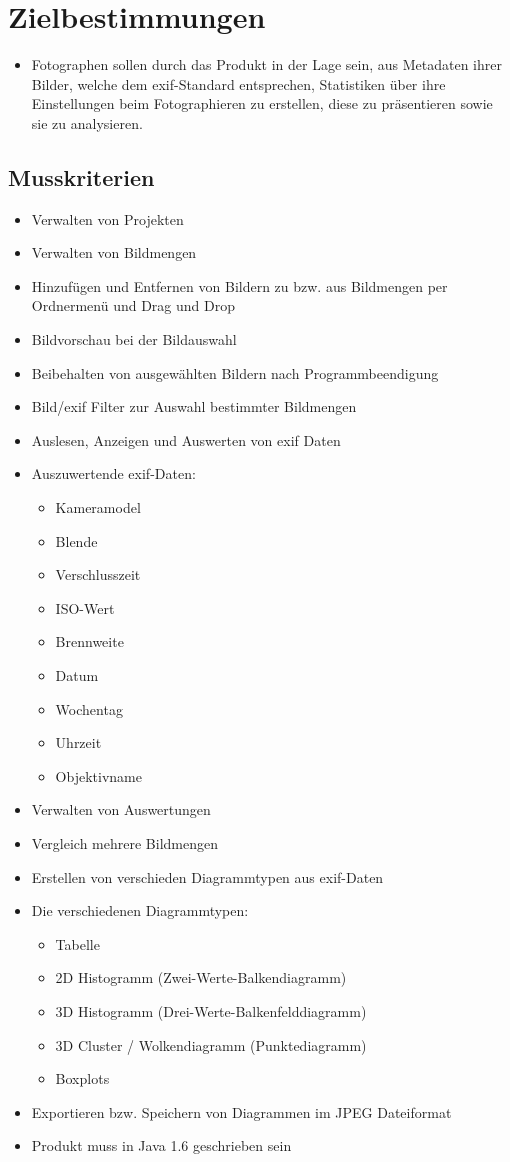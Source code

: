 \section{Zielbestimmungen}
\begin{itemize}
  \item Fotographen sollen durch das Produkt in der Lage sein, aus Metadaten ihrer Bilder, welche dem \gls{exif}-Standard entsprechen, Statistiken über ihre Einstellungen beim Fotographieren zu erstellen, diese zu präsentieren sowie sie zu analysieren.
  \end{itemize} 
\subsection{Musskriterien} 
\begin{itemize}
	\item Verwalten von Projekten
	\item Verwalten von Bildmengen
	\item Hinzufügen und Entfernen von Bildern zu bzw. aus Bildmengen per Ordnermenü und Drag und Drop
	\item Bildvorschau bei der Bildauswahl
	\item Beibehalten von ausgewählten Bildern nach Programmbeendigung
	\item Bild/\gls{exif} Filter zur Auswahl bestimmter Bildmengen
	\item Auslesen, Anzeigen und Auswerten von \gls{exif} Daten
	\item Auszuwertende \gls{exif}-Daten:
			\begin{itemize}
			\item Kameramodel
			\item Blende 
			\item Verschlusszeit
			\item ISO-Wert
			\item Brennweite
			\item Datum
			\item Wochentag
			\item Uhrzeit
			\item Objektivname
		\end{itemize}
	\item Verwalten von Auswertungen
	\item Vergleich mehrere Bildmengen
	\item Erstellen von verschieden Diagrammtypen aus \gls{exif}-Daten
	\item Die verschiedenen Diagrammtypen:
		\begin{itemize}
		  \item Tabelle
			\item 2D Histogramm (Zwei-Werte-Balkendiagramm)
			\item 3D Histogramm (Drei-Werte-Balkenfelddiagramm)
			\item 3D Cluster / Wolkendiagramm (Punktediagramm)
			\item Boxplots
		\end{itemize}
	\item Exportieren bzw. Speichern von Diagrammen im JPEG Dateiformat
	\item Produkt muss in Java 1.6 geschrieben sein	
\end{itemize}

